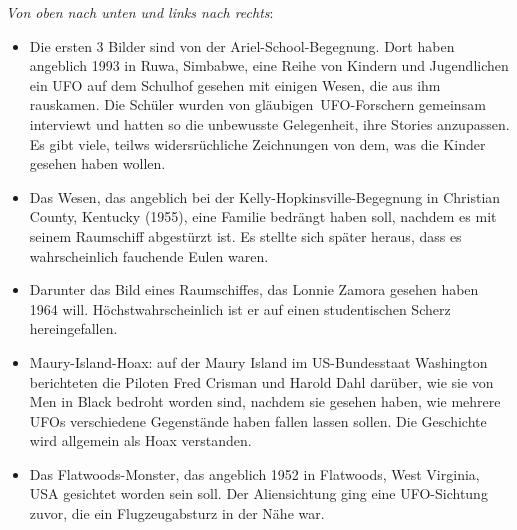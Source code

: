 \documentclass{scrartcl}
\begin{document}
\textit{Von oben nach unten und links nach rechts}:

\begin{itemize}
	\item Die ersten 3 Bilder sind von der Ariel-School-Begegnung. Dort haben angeblich 1993 in Ruwa, Simbabwe, eine Reihe von Kindern und Jugendlichen ein UFO auf dem Schulhof gesehen mit einigen Wesen, die aus ihm rauskamen.
		Die Schüler wurden von \frq gläubigen\flq\ UFO-Forschern gemeinsam interviewt und hatten so die unbewusste Gelegenheit, ihre Stories anzupassen. Es gibt viele, teilws widersrüchliche Zeichnungen von dem, was die Kinder gesehen haben wollen.
	\item Das Wesen, das angeblich bei der Kelly-Hopkinsville-Begegnung in Christian County, Kentucky (1955), eine Familie bedrängt haben soll, nachdem es mit seinem Raumschiff abgestürzt ist. Es stellte sich später heraus, dass es wahrscheinlich fauchende Eulen waren.
	\item Darunter das Bild eines Raumschiffes, das Lonnie Zamora gesehen haben 1964 will. Höchstwahrscheinlich ist er auf einen studentischen Scherz hereingefallen.
	\item Maury-Island-Hoax: auf der Maury Island im US-Bundesstaat Washington berichteten die Piloten Fred Crisman und Harold Dahl darüber, wie sie von Men in Black bedroht worden sind, nachdem sie gesehen haben, wie mehrere UFOs verschiedene Gegenstände haben fallen lassen sollen. Die Geschichte wird allgemein als Hoax verstanden.
	\item Das \frq Flatwoods-Monster\flq, das angeblich 1952 in Flatwoods, West Virginia, USA gesichtet worden sein soll. Der Aliensichtung ging eine UFO-Sichtung zuvor, die ein Flugzeugabsturz in der Nähe war.
\end{itemize}
\end{document}
